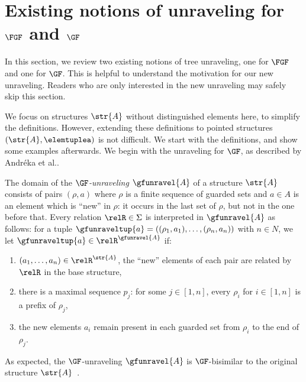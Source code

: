 \section{Existing notions of unraveling for $\FGF$ and $\GF$}
In this section, we review two existing notions of tree unraveling, one for $\FGF$ and one for $\GF$.
This is helpful to understand the motivation for our new unraveling.
Readers who are only interested in the new unraveling may safely skip this section.

We focus on structures $\str{A}$ without distinguished elements here, to simplify the definitions.
However, extending these definitions to pointed structures $(\str{A}, \elemtuplea)$ is not difficult.
We start with the definitions, and show some examples afterwards.
We begin with the unraveling for $\GF$, as described by Andréka et al.\cite[Sec 4.3, p. 247]{AndrekaNB98}.
\begin{definition}[$\GF$-unraveling]
  The domain of the \emph{$\GF$-unraveling} $\gfunravel{A}$ of a structure $\str{A}$ consists of pairs $(\rho, a)$ where $\rho$ is a finite sequence of guarded sets and $a \in A$ is an element which is ``new'' in $\rho$: it occurs in the last set of $\rho$, but not in the one before that.
  Every relation $\relR \in \Sigma$ is interpreted in $\gfunravel{A}$ as follows: for a tuple $\gfunraveltup{a} = ((\rho_{1}, a_{1}), \ldots, (\rho_{n}, a_{n}))$ with $n \in N$, we let $\gfunraveltup{a} \in \relR^{\gfunravel{A}}$ if:
  \begin{enumerate}
    \item $(a_{1}, \ldots, a_{n}) \in \relR^{\str{A}}$, \ie{} the ``new'' elements of each pair are related by $\relR$ in the base structure,
    \item there is a maximal sequence $p_{j}$: for some $j \in [1,n]$, every $\rho_{i}$ for $i \in [1,n]$ is a prefix of $\rho_{j}$,
    \item the new elements $a_{i}$ remain present in each guarded set from $\rho_{i}$ to the end of $\rho_{j}$.
  \end{enumerate}
\end{definition}
As expected, the $\GF$-unraveling $\gfunravel{A}$ is $\GF$-bisimilar to the original structure $\str{A}$~\cite[Proposition 4.3.1]{AndrekaNB98}.

